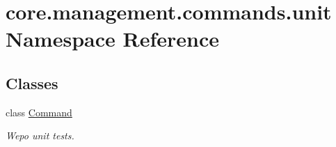 \hypertarget{namespacecore_1_1management_1_1commands_1_1unit}{\section{core.\-management.\-commands.\-unit Namespace Reference}
\label{namespacecore_1_1management_1_1commands_1_1unit}
}
\subsection*{Classes}
\begin{DoxyCompactItemize}
\item 
class \hyperlink{classcore_1_1management_1_1commands_1_1unit_1_1Command}{Command}
\begin{DoxyCompactList}\small\item\em Wepo unit tests. \end{DoxyCompactList}\end{DoxyCompactItemize}
